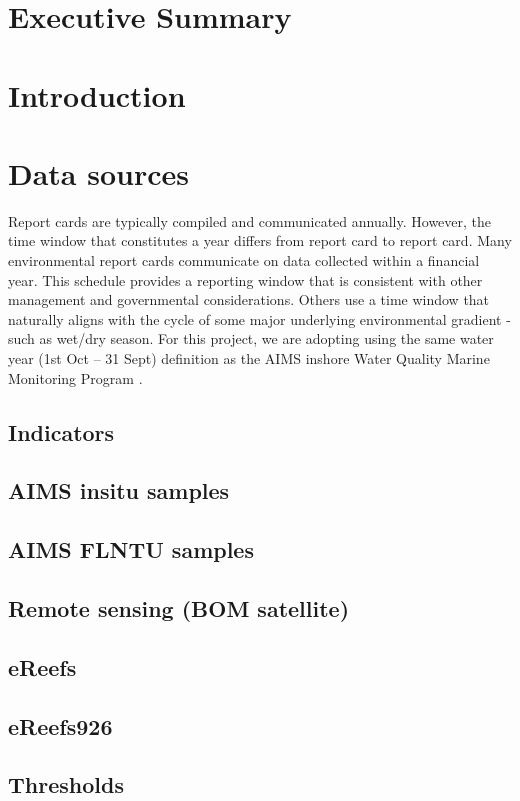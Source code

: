 \documentclass[a4paper,8pt]{AIMSreport}
\begin{document}
\section{Executive Summary}

\section{Introduction}

\section{Data sources}

Report cards are typically compiled and communicated annually.
However, the time window that constitutes a year differs from report card to report card.
Many environmental report cards communicate on data collected within a financial year.
This schedule provides a reporting window that is consistent with other management and governmental
considerations.  Others use a time window that naturally aligns with the cycle of some major underlying environmental
gradient - such as wet/dry season. For this project, we are adopting using the same water year (1st Oct -- 31 Sept) definition as the AIMS inshore Water
Quality Marine Monitoring Program \citep{Lonborg-MMP-2015}.

\subsection{Indicators}
\subsection{AIMS insitu samples}
\subsection{AIMS FLNTU samples}
\subsection{Remote sensing (BOM satellite)}
\subsection{eReefs}
\subsection{eReefs926}
\subsection{Thresholds}
\end{document}
